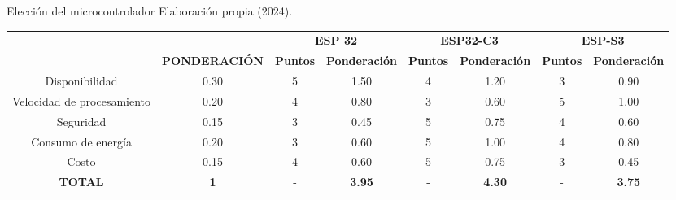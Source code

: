 \begin{tabla}[micro]  
{Elección del microcontrolador}
{Elaboración propia (2024).}
\centering
\resizebox{15cm}{!} 
{
\begin{tabular}{|c|c|c|c|c|c|c|c|} 
\hline
\rowcolor[rgb]{0.678,0.702,0.698} {\cellcolor[rgb]{0.678,0.702,0.698}}                                    & {\cellcolor[rgb]{0.678,0.702,0.698}}                                       & \multicolumn{2}{c|}{\textbf{ESP 32}}   & \multicolumn{2}{c|}{\textbf{ESP32-C3}} & \multicolumn{2}{c|}{\textbf{ESP-S3}}    \\
\rowcolor[rgb]{0.678,0.702,0.698} \multirow{-2}{*}{{\cellcolor[rgb]{0.678,0.702,0.698}}\textbf{CRITERIO}} & \multirow{-2}{*}{{\cellcolor[rgb]{0.678,0.702,0.698}}\textbf{PONDERACIÓN}} & \textbf{Puntos} & \textbf{Ponderación} & \textbf{Puntos} & \textbf{Ponderación} & \textbf{Puntos} & \textbf{Ponderación}  \\ 
\hline
\rowcolor[rgb]{0.027,0.894,0.698} Disponibilidad                                                          & 0.30                                                                       & 5               & 1.50                 & 4               & 1.20                 & 3               & 0.90                  \\ 
\hline
\rowcolor[rgb]{0.027,0.894,0.675} Velocidad de procesamiento                                              & 0.20                                                                       & 4               & 0.80                 & 3               & 0.60                 & 5               & 1.00                  \\ 
\hline
Seguridad                                                                                                 & 0.15                                                                       & 3               & 0.45                 & 5               & 0.75                 & 4               & 0.60                  \\ 
\hline
\rowcolor[rgb]{0.027,0.894,0.675} Consumo de energía                                                      & 0.20                                                                       & 3               & 0.60                 & 5               & 1.00                 & 4               & 0.80                  \\ 
\hline
Costo                                                                                                     & 0.15                                                                       & 4               & 0.60                 & 5               & 0.75                 & 3               & 0.45                  \\ 
\hline
\textbf{TOTAL}                                                                                            & \textbf{1}                                                                 & -               & \textbf{3.95}        & -               & \textbf{4.30}        & -               & \textbf{3.75}         \\
\hline
\end{tabular}
}
\end{tabla}
